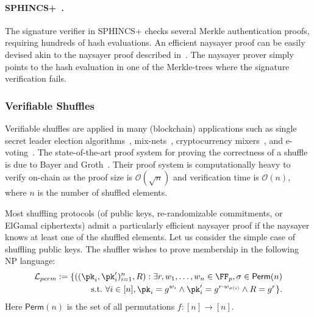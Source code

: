 \paragraph{SPHINCS+~\cite{CCS:BHKNRS19}.} The signature verifier in SPHINCS+ checks several Merkle authentication proofs, requiring hundreds of hash evaluations. An efficient naysayer proof can be easily devised akin to the naysayer proof described in~. The naysayer prover simply points to the hash evaluation in one of the Merkle-trees where the signature verification fails. 

\subsubsection{Verifiable Shuffles}\label{sec:vshuffle_naysayer}
Verifiable shuffles are applied in many (blockchain) applications such as single secret leader election algorithms~\cite{AFT:Boneh20}, mix-nets~\cite{CACM:Chaum81}, cryptocurrency mixers~\cite{EPRINT:SNBB19}, and e-voting~\cite{USENIX:Adida08}. The state-of-the-art proof system for proving the correctness of a shuffle is due to Bayer and Groth~\cite{EC:BayGro12}. Their proof system is computationally heavy to verify on-chain as the proof size is $\mathcal{O}(\sqrt{n})$ and verification time is $\mathcal{O}(n)$, where $n$ is the number of shuffled elements. 

Most shuffling protocols (of public keys, re-randomizable commitments, or ElGamal ciphertexts) admit a particularly efficient naysayer proof if the naysayer knows at least one of the shuffled elements. Let us consider the simple case of shuffling public keys. The shuffler wishes to prove membership in the following  NP language:
\begin{align*}%
    \Lang_{perm}:= \{ ((\pk_i,\pk_i')_{i=1}^n,R) : \exists r,\witness_1,\dots,\witness_n \in \FF_p, \sigma \in\mathsf{Perm}(n) \\
    \suchthat \forall i\in[n], \pk_i = g^{\witness_i} \land \pk_i' = g^{r \cdot \witness_{\sigma(i)}} \land R = g^r
    \}.
\end{align*}
Here $\mathsf{Perm}(n)$ is the set of all permutations $f:[n]\rightarrow[n]$.

